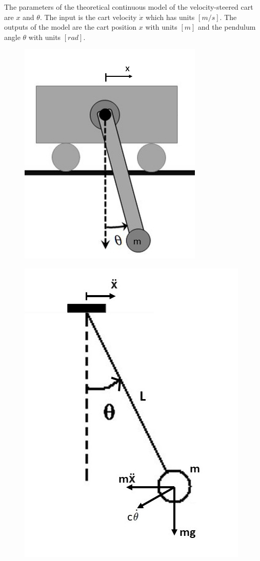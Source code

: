 \documentclass[a4paper,kul]{kulakarticle} %
\begin{document}
The parameters of the theoretical continuous model of the velocity-steered cart are $x$ and $\theta$. The input is the cart velocity $\dot{x}$ which has units $[m/s]$. The outputs of the model are the cart position $x$ with units $[m]$ and the pendulum angle $\theta$ with units $[rad]$. 
\begin{figure}[htp!]
	\centering
	\begin{minipage}{.5\textwidth}
		\centering
		\includegraphics[width=.8\linewidth]{pendulumoncart.png}
		\label{fig:pendulumoncart}
	\end{minipage}%
	\begin{minipage}{.5\textwidth}
		\centering
		\includegraphics[width=0.8\linewidth]{VLDpendulum.jpg}

\end{minipage}
\end{figure}
\end{document}
